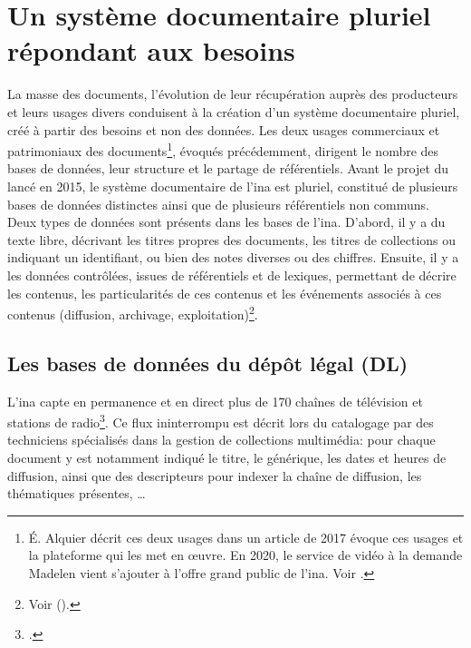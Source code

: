 \section{\label{I-B-2}Un système documentaire pluriel répondant aux besoins}

La masse des documents, l'évolution de leur récupération auprès des producteurs et leurs usages divers conduisent à la création d'un système documentaire pluriel, créé à partir des besoins et non des données. Les deux usages commerciaux et patrimoniaux des documents\footnote{É. Alquier décrit ces deux usages dans un article de 2017 évoque ces usages et la plateforme qui les met en œuvre. En 2020, le service de vidéo à la demande Madelen vient s'ajouter à l'offre \og grand public\fg{} de l'\ac{ina}. Voir \cite{alquier_production_2017}.}, évoqués précédemment, dirigent le nombre des bases de données, leur structure et le partage de référentiels. Avant le projet du \ldd lancé en 2015, le système documentaire de l'\ac{ina} est pluriel, constitué de plusieurs bases de données distinctes ainsi que de plusieurs référentiels non communs.\\

Deux types de données sont présents dans les bases de l'\ac{ina}. D'abord, il y a du texte libre, décrivant les titres propres des documents, les titres de collections ou indiquant un identifiant, ou bien des notes diverses ou des chiffres. Ensuite, il y a les données contrôlées, issues de référentiels et de lexiques, permettant de décrire les contenus, les particularités de ces contenus et les événements associés à ces contenus (diffusion, archivage, exploitation)\footnote{Voir  ().}.

\subsection{\label{I-B-2-a}Les bases de données du dépôt légal (DL)}

L'\ac{ina} capte en permanence et en direct plus de 170 chaînes de télévision et stations de radio\footcite[p.5]{institut_national_de_laudiovisuel_rapport_2019}. Ce flux ininterrompu est décrit lors du catalogage par des techniciens spécialisés dans la gestion de collections multimédia: pour chaque document y est notamment indiqué le titre, le générique, les dates et heures de diffusion, ainsi que des descripteurs pour indexer la chaîne de diffusion, les thématiques présentes, \dots\\

